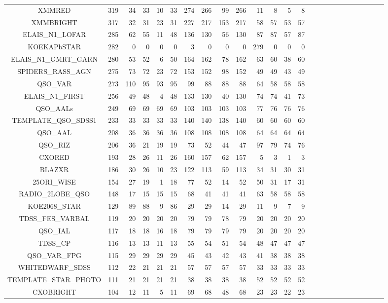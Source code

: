 \documentclass[onecolumn]{aa}
\begin{document}
\begin{landscape}
\begin{center}
\begin{longtable}{c r rrrr rrrr rrrrr rrrrr rrrrr}
XMMRED & 319 & 34 & 33 & 10 & 33 & 274 & 266 & 99 & 266 & 11 & 8 & 5 & 8 \\ 
XMMBRIGHT & 317 & 32 & 31 & 23 & 31 & 227 & 217 & 153 & 217 & 58 & 57 & 53 & 57 \\ 
ELAIS\_N1\_LOFAR & 285 & 62 & 55 & 11 & 48 & 136 & 130 & 56 & 130 & 87 & 87 & 57 & 87 \\ 
KOEKAPbSTAR & 282 & 0 & 0 & 0 & 0 & 3 & 0 & 0 & 0 & 279 & 0 & 0 & 0 \\ 
ELAIS\_N1\_GMRT\_GARN & 280 & 53 & 52 & 6 & 50 & 164 & 162 & 78 & 162 & 63 & 60 & 38 & 60 \\ 
SPIDERS\_RASS\_AGN & 275 & 73 & 72 & 23 & 72 & 153 & 152 & 98 & 152 & 49 & 49 & 43 & 49 \\ 
QSO\_VAR & 273 & 110 & 95 & 93 & 95 & 99 & 88 & 88 & 88 & 64 & 58 & 58 & 58 \\ 
ELAIS\_N1\_FIRST & 256 & 49 & 48 & 4 & 48 & 133 & 130 & 40 & 130 & 74 & 74 & 41 & 73 \\ 
QSO\_AALs & 249 & 69 & 69 & 69 & 69 & 103 & 103 & 103 & 103 & 77 & 76 & 76 & 76 \\ 
TEMPLATE\_QSO\_SDSS1 & 233 & 33 & 33 & 33 & 33 & 140 & 140 & 138 & 140 & 60 & 60 & 60 & 60 \\ 
QSO\_AAL & 208 & 36 & 36 & 36 & 36 & 108 & 108 & 108 & 108 & 64 & 64 & 64 & 64 \\ 
QSO\_RIZ & 206 & 36 & 21 & 19 & 19 & 73 & 52 & 44 & 47 & 97 & 79 & 74 & 76 \\ 
CXORED & 193 & 28 & 26 & 11 & 26 & 160 & 157 & 62 & 157 & 5 & 3 & 1 & 3 \\ 
BLAZXR & 186 & 30 & 26 & 10 & 23 & 122 & 113 & 59 & 113 & 34 & 31 & 30 & 31 \\ 
25ORI\_WISE & 154 & 27 & 19 & 1 & 18 & 77 & 52 & 14 & 52 & 50 & 31 & 17 & 31 \\ 
RADIO\_2LOBE\_QSO & 148 & 17 & 15 & 15 & 15 & 68 & 41 & 41 & 41 & 63 & 58 & 58 & 58 \\ 
KOE2068\_STAR & 129 & 89 & 88 & 9 & 86 & 29 & 29 & 14 & 29 & 11 & 9 & 7 & 9 \\ 
TDSS\_FES\_VARBAL & 119 & 20 & 20 & 20 & 20 & 79 & 79 & 78 & 79 & 20 & 20 & 20 & 20 \\ 
QSO\_IAL & 117 & 18 & 18 & 16 & 18 & 79 & 79 & 79 & 79 & 20 & 20 & 20 & 20 \\ 
TDSS\_CP & 116 & 13 & 13 & 11 & 13 & 55 & 54 & 51 & 54 & 48 & 47 & 47 & 47 \\ 
QSO\_VAR\_FPG & 115 & 29 & 29 & 29 & 29 & 45 & 43 & 42 & 43 & 41 & 38 & 38 & 38 \\ 
WHITEDWARF\_SDSS & 112 & 22 & 21 & 21 & 21 & 57 & 57 & 57 & 57 & 33 & 33 & 33 & 33 \\ 
TEMPLATE\_STAR\_PHOTO & 111 & 21 & 21 & 21 & 21 & 38 & 38 & 38 & 38 & 52 & 52 & 52 & 52 \\ 
CXOBRIGHT & 104 & 12 & 11 & 5 & 11 & 69 & 68 & 48 & 68 & 23 & 23 & 22 & 23 \\ 
\hline
\end{longtable}
\end{center}
\end{landscape}
\end{document}
